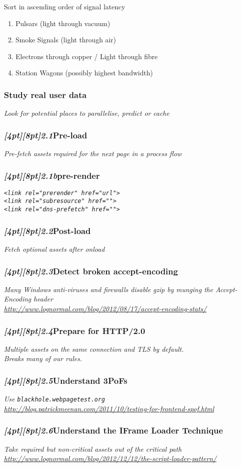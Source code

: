 \documentclass{beamer}
\newcommand{\sn}[1]{\textrm{\textit{\Huge{\raisebox{-3pt}[4pt][8pt]{\textcolor{f2elblue}{#1}}}}}\hspace{4pt}}
\newcommand{\innersplash}[1]{
  \begin{center}
    \Large \textrm{\textit{ #1 } }
  \end{center}
}
\newcommand{\splashslide}[2][{}]{
  \begin{frame}
  \frametitle{#1}
  \innersplash{#2}
  \end{frame}
}
\begin{document}
\begin{frame}{Sort in ascending order of signal latency}
\begin{enumerate}
  \item Pulsars (light through vacuum)
  \item Smoke Signals (light through air)
  \item Electrons through copper / Light through fibre
  \item Station Wagons (possibly highest bandwidth)
\end{enumerate}
\end{frame}

\splashslide[Study real user data]{Look for potential places to parallelise, predict or cache}

\splashslide[\sn{2.1}Pre-load]{Pre-fetch assets required for the next page in a process flow}

\splashslide[\sn{2.1b}pre-render]{\texttt{<link rel="prerender" href="url">} \\ \vfill \texttt{<link rel="subresource" href="">} \\ \vfill \texttt{<link rel="dns-prefetch" href="">} }

\splashslide[\sn{2.2}Post-load]{Fetch optional assets after onload}

\splashslide[\sn{2.3}Detect broken accept-encoding]{Many Windows anti-viruses and firewalls disable gzip by munging the Accept-Encoding header \\ \vfill \href{http://www.lognormal.com/blog/2012/08/17/accept-encoding-stats/}{\small http://www.lognormal.com/blog/2012/08/17/accept-encoding-stats/}}

\splashslide[\sn{2.4}Prepare for HTTP/2.0]{Multiple assets on the same connection and TLS by default. \\ Breaks many of our rules.}

\splashslide[\sn{2.5}Understand 3PoFs]{Use \texttt{blackhole.webpagetest.org} \\ \vfill \href{http://blog.patrickmeenan.com/2011/10/testing-for-frontend-spof.html}{\small http://blog.patrickmeenan.com/2011/10/testing-for-frontend-spof.html}}

\splashslide[\sn{2.6}Understand the IFrame Loader Technique]{Take required but non-critical assets out of the critical path \\ \vfill \href{http://www.lognormal.com/blog/2012/12/12/the-script-loader-pattern/}{\small http://www.lognormal.com/blog/2012/12/12/the-script-loader-pattern/}}
\end{document}
